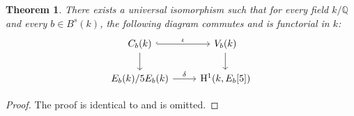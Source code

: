 \documentclass{article} %
\newtheorem{theorem}[proposition]{Theorem}
\numberwithin{equation}{section}
\theoremstyle{definition}
\newcommand{\HH}{\mathrm{H}}
\newcommand{\Q}{\mathbb{Q}}
\begin{document}
\begin{theorem}\label{theorem: compatibility descent map orbit construction}
    There exists a universal isomorphism such that for every field $k/\Q$ and every $b\in B^s(k)$, the following diagram commutes and is functorial in $k$:
\[\begin{tikzcd}
	{C_b(k)} & {V_b(k)} \\
	{E_b(k)/5E_b(k)} & {\HH^1(k,E_b[5])}
	\arrow["\iota", hook, from=1-1, to=1-2]
	\arrow[from=1-1, to=2-1]
	\arrow[from=1-2, to=2-2]
	\arrow["\delta", from=2-1, to=2-2]
\end{tikzcd}\]
\end{theorem}
\begin{proof}
    The proof is identical to \cite[Theorem 4.15]{Thorne-thesis} and is omitted.
\end{proof}
\end{document}
